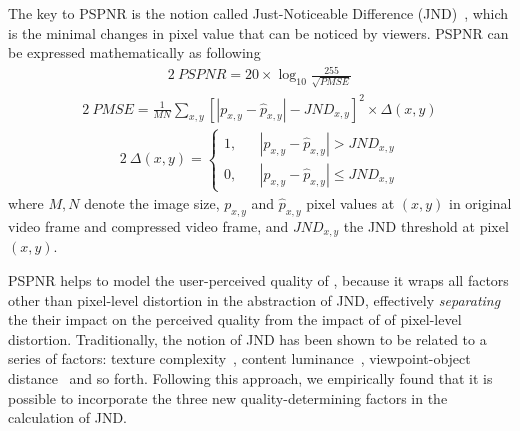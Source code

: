 The key to PSPNR is the notion called Just-Noticeable Difference (JND)~\cite{??}, which is the minimal changes in pixel value that can be noticed by viewers. 
PSPNR can be expressed mathematically as following
\vspace{-0.3cm}
\begin{alignat}{2}\
\label{f1} PSPNR = 20 \times \log_{10}\frac{255}{\sqrt{PMSE}}
\end{alignat}
\vspace{-0.3cm}
\begin{alignat}{2}\
PMSE=\frac{1}{MN}\sum_{x,y}\left[ |p_{x,y} - \hat{p}_{x,y}| - JND_{x,y}\right]^2 \times \Delta (x, y)
\end{alignat}
\vspace{-0.3cm}
\begin{alignat}{2}\
\Delta (x, y) =\left\{
\begin{aligned}
1, & &|p_{x,y} - \hat{p}_{x,y}| > JND_{x,y} \\
0, & &|p_{x,y} - \hat{p}_{x,y}| \le JND_{x,y}
\end{aligned}
\right.
\end{alignat}
where $M,N$ denote the image size, $p_{x,y}$ and $\hat{p}_{x,y}$ pixel values at $(x, y)$ in original video frame and compressed video frame, and $JND_{x,y}$ the JND threshold at pixel $(x, y)$.

PSPNR helps to model the user-perceived quality of \vrvideos, because it wraps all factors other than pixel-level distortion in the abstraction of JND, effectively {\em separating} the their impact on the perceived quality from the impact of of pixel-level distortion. 
Traditionally, the notion of JND has been shown to be related to a series of factors: texture complexity~\cite{??}, content luminance~\cite{??}, viewpoint-object distance~\cite{??} and so forth.
Following this approach, we empirically found that it is possible to incorporate the three new quality-determining factors in the calculation of JND.



%
%

